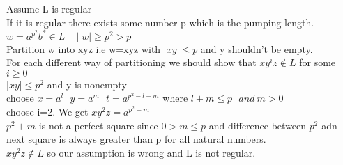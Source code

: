 \documentclass[12pt]{article}
\begin{document}
Assume L is regular
\\
If it is regular there exists some number p which is the pumping length.
\\
$w=a^{p^2}b^* \in L \ \ \ \ \mid w\mid \geq p^2 > p$ 
\\
Partition w into xyz i.e w=xyz with $\mid xy \mid \leq p$ and y shouldn't be empty.
\\
For each different way of partitioning we should show that $xy^iz \not \in L$ for some $i \geq 0$
\\
$\mid xy \mid \leq p^2 $ and y is nonempty
\\
choose $x=a^l \ \ \ y=a^m \ \ \ t= a^{p^2-l-m}$ where $l+m \leq p \ \ \ and\  m > 0$
\\
choose i=2. We get $xy^2z=a^{p^2+m} $
\\ 
$ p^2+m$ is not a perfect square since $0 > m \leq p$ and difference between $p^2$ adn next square is always greater than p for all natural numbers. 
\\
$xy^2z \not \in L$ so our assumption is wrong and L is not regular.
\end{document}
